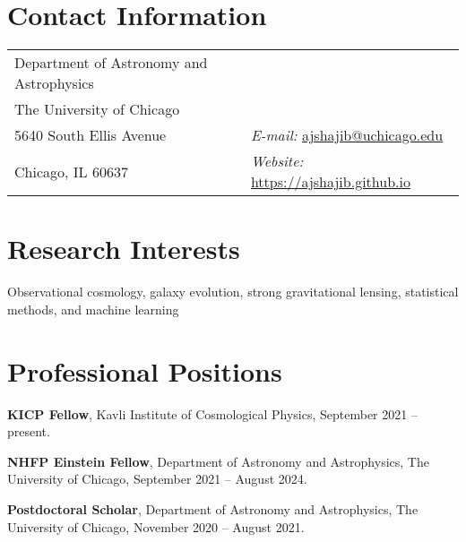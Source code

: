 \documentclass[margin, line]{res}
\newenvironment{list1}{
  \begin{list}{\ding{113}}{%
      \setlength{\itemsep}{0in}
      \setlength{\parsep}{0in} \setlength{\parskip}{0in}
      \setlength{\topsep}{0in} \setlength{\partopsep}{0in} 
      \setlength{\leftmargin}{0.17in}}}{\end{list}}
\begin{document}

\begin{resume}


\section{\sc Contact Information}
\vspace{.05in}
\begin{tabular}{@{}p{3in}p{3in}}                  
Department of Astronomy and Astrophysics  \\ %
The University of Chicago  &  \\     
5640 South Ellis Avenue 	         & {\it E-mail:}  \href{mailto:ajshajib@astro.ucla.edu}{ajshajib@uchicago.edu} \\
Chicago, IL 60637  & {\it Website:} \url{https://ajshajib.github.io} \\   
\end{tabular}


\section{\sc Research Interests}
Observational cosmology, galaxy evolution, strong gravitational lensing,  statistical methods, and machine learning

\vspace*{2.5mm}
\section{\sc Professional Positions}

\vspace*{.16in}
\begin{list1}
	\item[] \textbf{KICP Fellow}, Kavli Institute of Cosmological Physics, September 2021 -- present.
	\item[] \textbf{NHFP Einstein Fellow}, Department of Astronomy and Astrophysics, The University of Chicago, September 2021 -- August 2024.
	\item[] \textbf{Postdoctoral Scholar}, Department of Astronomy and Astrophysics, The University of Chicago, November 2020 -- August 2021.
\end{list1}


\end{resume}
\end{document}
